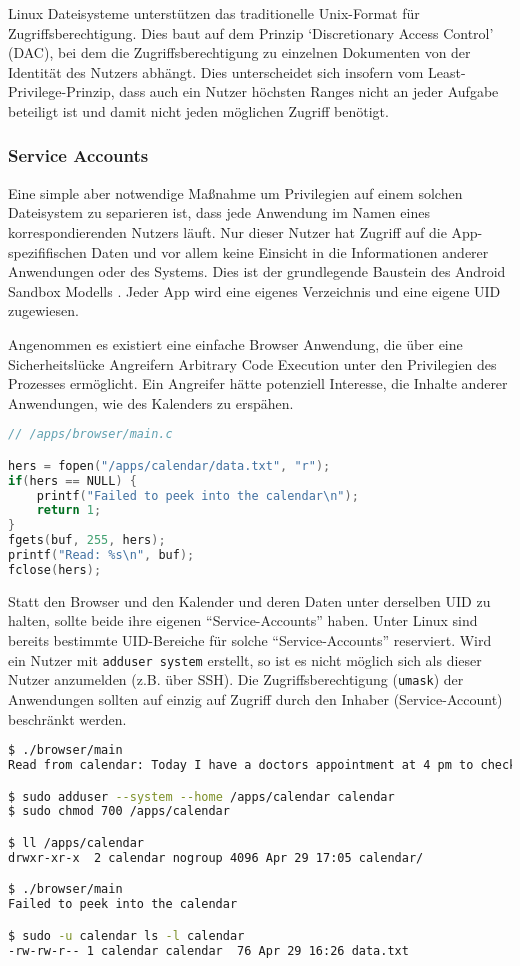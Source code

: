 Linux Dateisysteme unterstützen das traditionelle Unix-Format für Zugriffsberechtigung. Dies baut auf dem Prinzip `Discretionary Access Control' (DAC), bei dem die Zugriffsberechtigung zu einzelnen Dokumenten von der Identität des Nutzers abhängt. Dies unterscheidet sich insofern vom Least-Privilege-Prinzip, dass auch ein Nutzer höchsten Ranges nicht an jeder Aufgabe beteiligt ist und damit nicht jeden möglichen Zugriff benötigt.


\subsubsection{Service Accounts}

Eine simple aber notwendige Maßnahme um Privilegien auf einem solchen Dateisystem zu separieren ist, dass jede Anwendung im Namen eines korrespondierenden Nutzers läuft. Nur dieser Nutzer hat Zugriff auf die App-spezififischen Daten und vor allem keine Einsicht in die Informationen anderer Anwendungen oder des Systems. Dies ist der grundlegende Baustein des Android Sandbox Modells \cite{android-sandbox}. Jeder App wird eine eigenes Verzeichnis und eine eigene UID zugewiesen.

Angenommen es existiert eine einfache Browser Anwendung, die über eine Sicherheitslücke Angreifern Arbitrary Code Execution unter den Privilegien des Prozesses ermöglicht. Ein Angreifer hätte potenziell Interesse, die Inhalte anderer Anwendungen, wie des Kalenders zu erspähen.

\begin{lstlisting}[language=c]
// /apps/browser/main.c

hers = fopen("/apps/calendar/data.txt", "r");
if(hers == NULL) {
    printf("Failed to peek into the calendar\n");
    return 1;
}
fgets(buf, 255, hers);  
printf("Read: %s\n", buf);
fclose(hers);
\end{lstlisting}

Statt den Browser und den Kalender und deren Daten unter derselben UID zu halten, sollte beide ihre eigenen ``Service-Accounts'' haben. Unter Linux sind bereits bestimmte UID-Bereiche für solche ``Service-Accounts'' reserviert. Wird ein Nutzer mit \texttt{adduser \-\-system} erstellt, so ist es nicht möglich sich als dieser Nutzer anzumelden (z.B. über SSH). Die Zugriffsberechtigung (\texttt{umask}) der Anwendungen sollten auf einzig auf Zugriff durch den Inhaber (Service-Account) beschränkt werden.

\begin{lstlisting}[language=bash]
$ ./browser/main
Read from calendar: Today I have a doctors appointment at 4 pm to check up on my stomach aches.

$ sudo adduser --system --home /apps/calendar calendar
$ sudo chmod 700 /apps/calendar

$ ll /apps/calendar
drwxr-xr-x  2 calendar nogroup 4096 Apr 29 17:05 calendar/

$ ./browser/main
Failed to peek into the calendar

$ sudo -u calendar ls -l calendar
-rw-rw-r-- 1 calendar calendar  76 Apr 29 16:26 data.txt
\end{lstlisting}

